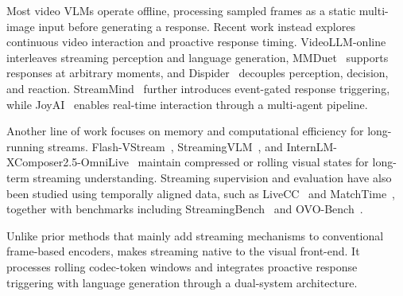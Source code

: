Most video VLMs operate offline, processing sampled frames as a static multi-image input before generating a response. Recent work instead explores continuous video interaction and proactive response timing. VideoLLM-online~\citep{chen2024videollmonline} interleaves streaming perception and language generation, MMDuet~\citep{wang2024mmduet} supports responses at arbitrary moments, and Dispider~\citep{qian2025dispider} decouples perception, decision, and reaction. StreamMind~\citep{ding2025streammind} further introduces event-gated response triggering, while JoyAI~\citep{joyai2026vlinteraction} enables real-time interaction through a multi-agent pipeline.

Another line of work focuses on memory and computational efficiency for long-running streams. Flash-VStream~\citep{zhang2024flashvstream}, StreamingVLM~\citep{xu2026streamingvlmrealtimeunderstandinginfinite}, and InternLM-XComposer2.5-OmniLive~\citep{zhang2024ixc25omnilive} maintain compressed or rolling visual states for long-term streaming understanding. Streaming supervision and evaluation have also been studied using temporally aligned data, such as LiveCC~\citep{chen2025livecclearningvideollm} and MatchTime~\citep{rao2024matchtimeautomaticsoccergame}, together with benchmarks including StreamingBench~\citep{lin2024streamingbench} and OVO-Bench~\citep{li2025ovobench}.

Unlike prior methods that mainly add streaming mechanisms to conventional frame-based encoders, \magevl makes streaming native to the visual front-end. It processes rolling codec-token windows and integrates proactive response triggering with language generation through a dual-system architecture.





